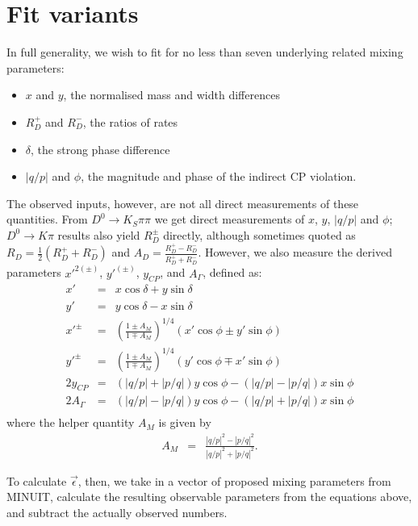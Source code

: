 \section{Fit variants}
\label{sec:fit_variants}
In full generality, we wish to fit for no less than seven underlying
related mixing parameters:
\begin{itemize}
\item $x$ and $y$, the normalised mass and width differences
\item $R_D^+$ and $R_D^-$, the ratios of rates
\item $\delta$, the strong phase difference
\item $|q/p|$ and $\phi$, the magnitude and phase of the indirect CP violation. 
\end{itemize}
The observed inputs, however, are not all direct measurements of these
quantities. From $D^0\to K_S\pi\pi$ we get direct measurements of $x$, $y$, $|q/p|$ and $\phi$;
$D^0\to K\pi$ results also yield $R_D^\pm$ directly, although sometimes quoted
as $R_D = \frac{1}{2}(R_D^+ + R_D^-)$ and $A_D = \frac{R_D^+ - R_D^-}{R_D^+ + R_D^-}$.
However, we also measure the derived parameters $x'^{2(\pm)}$, $y'^{(\pm)}$, $y_{CP}$, and $A_\Gamma$,
defined as:
\begin{eqnarray}
x' &=& x\cos\delta + y\sin\delta \\
y' &=& y\cos\delta - x\sin\delta \\
x'^{\pm} &=& \left(\frac{1\pm A_M}{1\mp A_M}\right)^{1/4}\left(x'\cos\phi \pm y'\sin\phi\right) \\
y'^{\pm} &=& \left(\frac{1\pm A_M}{1\mp A_M}\right)^{1/4}\left(y'\cos\phi \mp x'\sin\phi\right) \\
2y_{CP}  &=& \left(|q/p|+|p/q|\right)y\cos\phi - \left(|q/p|-|p/q|\right)x\sin\phi\\
2A_\Gamma  &=& \left(|q/p|-|p/q|\right)y\cos\phi - \left(|q/p|+|p/q|\right)x\sin\phi\\
\end{eqnarray}
where the helper quantity $A_M$ is given by
\begin{eqnarray}
A_M &=& \frac{|q/p|^2 - |p/q|^2}{|q/p|^2 + |p/q|^2}. 
\end{eqnarray}

To calculate $\vec\epsilon$, then, we take in a vector of proposed mixing parameters
from MINUIT, calculate the resulting observable parameters from the equations above, 
and subtract the actually observed numbers.


